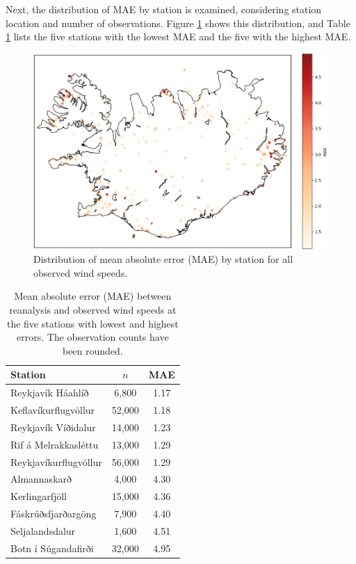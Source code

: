 Next, the distribution of MAE by station is examined, considering station location and number of observations. Figure \ref{fig:station_mae_distribution} shows this distribution, and Table \ref{table:station_mae_distribution} lists the five stations with the lowest MAE and the five with the highest MAE.

\begin{figure}[h]
  \centering
  \includegraphics[scale=0.6]{Figures/MAEoverIceland.png}
  \caption[MAE distribution by station]{Distribution of mean absolute error (MAE) by station for all observed wind speeds.}
  \label{fig:station_mae_distribution}
\end{figure}

\begin{table}[h]
  \centering
  \caption[Station MAE extremes]{Mean absolute error (MAE) between reanalysis and observed wind speeds at the five stations with lowest and highest errors. The observation counts have been rounded.}
  \label{table:station_mae_distribution}
  \begin{tabular}{lcc}
    \toprule
    Station               & $n$     & MAE  \\
    \midrule
    Reykjavík Háahlíð     & 6,800   & 1.17 \\
    Keflavíkurflugvöllur  & 52,000  & 1.18 \\
    Reykjavík Víðidalur   & 14,000  & 1.23 \\
    Rif á Melrakkasléttu  & 13,000  & 1.29 \\
    Reykjavíkurflugvöllur & 56,000  & 1.29 \\
    \midrule
    Almannaskarð          &  4,000  & 4.30 \\
    Kerlingarfjöll        & 15,000  & 4.36 \\
    Fáskrúðsfjarðargöng   &  7,900  & 4.40 \\
    Seljalandsdalur       &  1,600  & 4.51 \\
    Botn í Súgandafirði   & 32,000  & 4.95 \\
    \bottomrule
  \end{tabular}
\end{table}

